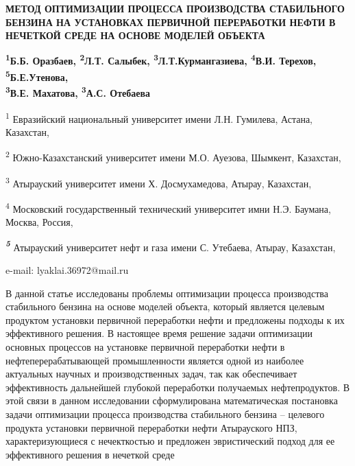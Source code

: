 \begin{center}

{\bfseries МЕТОД ОПТИМИЗАЦИИ ПРОЦЕССА ПРОИЗВОДСТВА СТАБИЛЬНОГО БЕНЗИНА НА УСТАНОВКАХ ПЕРВИЧНОЙ ПЕРЕРАБОТКИ НЕФТИ В НЕЧЕТКОЙ СРЕДЕ НА ОСНОВЕ МОДЕЛЕЙ ОБЪЕКТА}

{\bfseries \textsuperscript{1}Б.Б. Оразбаев, \textsuperscript{2}Л.Т.
Салыбек\envelope , \textsuperscript{3}Л.Т.Курмангазиева,
\textsuperscript{4}В.И. Терехов, \textsuperscript{5}Б.Е.Утенова,\\ \textsuperscript{3}В.Е. Махатова, \textsuperscript{3}А.С.
Отебаева}

\textsuperscript{1} Евразийский национальный университет имени Л.Н.
Гумилева, Астана, Казахстан,

\textsuperscript{2} Южно-Казахстанский университет имени М.О. Ауезова,
Шымкент, Казахстан,

\textsuperscript{3} Атырауский университет имени Х. Досмухамедова,
Атырау, Казахстан,

\textsuperscript{4} Московский государственный технический университет
имни Н.Э. Баумана, Москва, Россия,

\emph{{\bfseries \textsuperscript{5}}} Атырауский университет нефт и газа
имени С. Утебаева, Атырау, Казахстан,

e-mail: lyaklai.36972@mail.ru
\end{center}

В данной статье исследованы проблемы оптимизации процесса производства
стабильного бензина на основе моделей объекта, который является целевым
продуктом установки первичной переработки нефти и предложены подходы к
их эффективного решения. В настоящее время решение задачи оптимизации
основных процессов на установке первичной переработки нефти в
нефтеперерабатывающей промышленности является одной из наиболее
актуальных научных и производственных задач, так как обеспечивает
эффективность дальнейшей глубокой переработки получаемых нефтепродуктов.
В этой связи в данном исследовании сформулирована математическая
постановка задачи оптимизации процесса производства стабильного бензина
-- целевого продукта установки первичной переработки нефти Атырауского
НПЗ, характеризующиеся с нечекткостью и предложен эвристический подход
для ее эффективного решения в нечеткой среде

